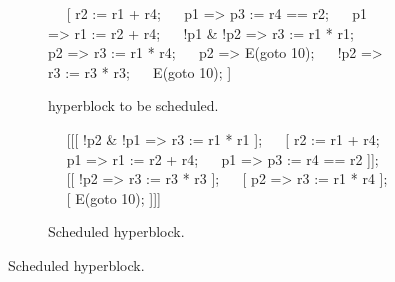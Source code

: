 

\begin{figure*}
  \centering
  \begin{subfigure}{\linewidth}
    \begin{subfigure}[b]{0.48\linewidth}
\begin{rtllisting}
~\sI{}~ [              r2 := r1 + r4;
~\sVI{}~   p1 =>        p3 := r4 == r2;
~\sII{}~   p1 =>        r1 := r2 + r4;
~\sIII{}~   !p1 & !p2 => r3 := r1 * r1;
~\sIV{}~   p2 =>        r3 := r1 * r4;
~\sVIIa{}~   p2 =>        E(goto 10);
~\sV{}~   !p2 =>       r3 := r3 * r3;
~\sVII{}~                E(goto 10);  ]
\end{rtllisting}
      \caption{\rtlblock{} hyperblock to be scheduled.}%
      \label{fig:op_chain_a}
    \end{subfigure}\hfill%
    \begin{subfigure}[b]{0.48\linewidth}
\begin{rtllisting}
~\sIII{}~ [[[ !p2 & !p1 => r3 := r1 * r1 ];
~\sI{}~   [              r2 := r1 + r4;
~\sII{}~      p1       => r1 := r2 + r4;
~\sVI{}~      p1       => p3 := r4 == r2 ]];
~\sV{}~  [[ !p2       => r3 := r3 * r3 ];
~\sIV{}~   [  p2       => r3 := r1 * r4 ];
~\sVII{}~   [              E(goto 10); ]]]
\end{rtllisting}
      \caption{Scheduled \rtlpar{} hyperblock.}%
      \label{fig:op_chain_c}
    \end{subfigure}
  \end{subfigure}\vspace{2em}
  \begin{subfigure}{\linewidth}
    \begin{subfigure}[b]{0.3\linewidth}
      \centering
\end{subfigure}
\end{subfigure}
\end{figure*}
